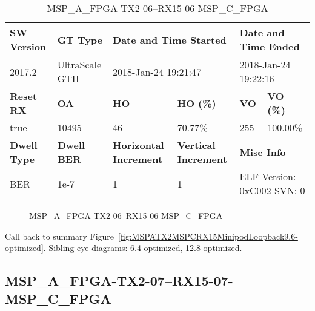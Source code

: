 \begin{table}[h]
\centering
\caption{MSP\_A\_FPGA-TX2-06--RX15-06-MSP\_C\_FPGA}
\label{tab:MSPAFPGATX206RX1506MSPCFPGA9.6-optimized}
\begin{tabular}{@{}|l|l|l|l|l|l|@{}}
\toprule
\textbf{SW Version}                & \textbf{GT Type}   & \multicolumn{2}{l|}{\textbf{Date and Time Started}}            & \multicolumn{2}{l|}{\textbf{Date and Time Ended}}        \\ \midrule
2017.2                       & UltraScale GTH          & \multicolumn{2}{l|}{2018-Jan-24 19:21:47}                   & \multicolumn{2}{l|}{2018-Jan-24 19:22:16}               \\ \midrule
\textbf{Reset RX}                  & \textbf{OA} & \textbf{HO}   & \textbf{HO (\%)} & \textbf{VO} & \textbf{VO (\%)} \\ \midrule
true & 10495        & 46          & 70.77\%        & 255        & 100.00\%       \\ \midrule
\textbf{Dwell Type}                & \textbf{Dwell BER} & \textbf{Horizontal Increment} & \textbf{Vertical Increment}    & \multicolumn{2}{l|}{\textbf{Misc Info}}                  \\ \midrule
BER                            & 1e-7        & 1        & 1           & \multicolumn{2}{l|}{ELF Version: 0xC002 SVN: 0}                         \\ \bottomrule
\end{tabular}
\end{table}

\begin{figure}[h]
\caption{MSP\_A\_FPGA-TX2-06--RX15-06-MSP\_C\_FPGA} \label{fig:MSPAFPGATX206RX1506MSPCFPGA9.6-optimized}
\end{figure}

Call back to summary Figure~\ref{fig:MSPATX2MSPCRX15MinipodLoopback9.6-optimized}.
Sibling eye diagrams: \hyperref[sec:MSPAFPGATX206RX1506MSPCFPGA6.4-optimized]{6.4-optimized}, \hyperref[sec:MSPAFPGATX206RX1506MSPCFPGA12.8-optimized]{12.8-optimized}.

\clearpage
\newpage


\subsection{MSP\_A\_FPGA-TX2-07--RX15-07-MSP\_C\_FPGA}\label{sec:MSPAFPGATX207RX1507MSPCFPGA9.6-optimized}

